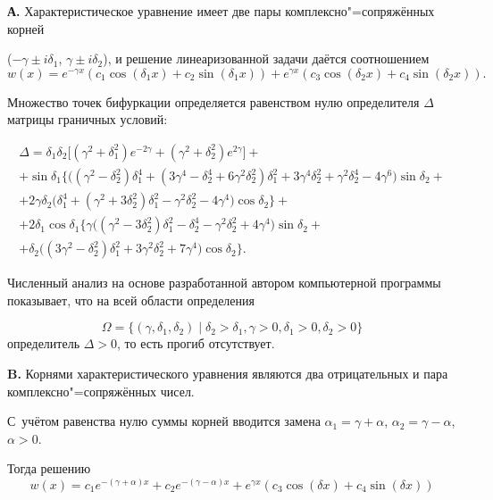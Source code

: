 \textbf{А.} Характеристическое уравнение имеет две пары комплексно"=сопряжённых корней 

($-\gamma\pm i\delta_1$, $\gamma\pm i\delta_2$), и решение линеаризованной задачи даётся соотношением $$

w(x)=e^{-\gamma x}( c_1 \cos(\delta_1 x)+c_2 \sin(\delta_1 x))+e^{\gamma x}\left( c_3 \cos(\delta_2 x)+ c_4 \sin(\delta_2 x)\right).$$ 

Множество точек бифуркации определяется равенством нулю определителя $\Delta$ матрицы граничных условий:

\begin{multline*}

\Delta = \delta_1\delta_2\big[(\gamma^2+\delta_1^2)e^{-2\gamma}+ (\gamma^2+\delta_2^2)e^{2\gamma} \big]+\\

+\sin\delta_1\Big\{ \big( (\gamma^2-\delta_2^2)\delta_1^4+(3\gamma^4-\delta_2^4+6\gamma^2\delta_2^2)\delta_1^2+ 3\gamma^4\delta_2^2+\gamma^2\delta_2^4-4\gamma^6 \big)\sin\delta_2+\\ +2\gamma\delta_2\big(\delta_1^4+(\gamma^2+3\delta_2^2)\delta_1^2-\gamma^2\delta_2^2-4\gamma^4\big)\cos\delta_2\Big\}+\\ +2\delta_1\cos\delta_1\Big\{ \gamma\big( (\gamma^2-3\delta_2^2)\delta_1^2-\delta_2^4-\gamma^2\delta_2^2+4\gamma^4 \big)\sin\delta_2+\\ +\delta_2\big((3\gamma^2-\delta_2^2)\delta_1^2+3\gamma^2\delta_2^2 +7\gamma^4\big)\cos\delta_2\Big\}.

\end{multline*}



Численный анализ на основе разработанной автором компьютерной программы показывает, что на всей области определения 

$$\Omega=\{(\gamma,\delta_1,\delta_2)\mid \delta_2>\delta_1, \gamma>0,\delta_1>0,\delta_2>0\}$$ определитель $\Delta>0$, то есть прогиб отсутствует.



\smallskip 



\textbf{B.} Корнями характеристического уравнения являются два отрицательных и пара комплексно"=сопряжённых чисел. 

С~учётом равенства нулю суммы корней вводится замена  $\alpha_1=\gamma+\alpha$, $\alpha_2=\gamma-\alpha$, $\alpha>0$. 

Тогда решению $$w(x)=c_1 e^{-(\gamma+\alpha)x} + c_2 e^{-(\gamma-\alpha)x}+e^{\gamma x}\left( c_3 \cos(\delta x)+c_4 \sin(\delta x)\right)$$ 


